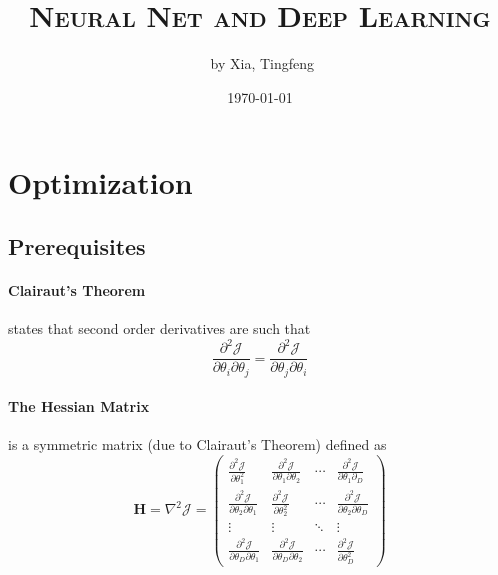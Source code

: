 \documentclass[11pt]{article}
\author{\ccLogo \,\,by Xia, Tingfeng}
\title{\textsc{Neural Net and Deep Learning}}
\date{\today}
\begin{document}
\maketitle
\doclicenseThis


\tableofcontents
\newpage


\section{Optimization}
\subsection{Prerequisites}

\paragraph{Clairaut's Theorem} states that second order derivatives are such that
\begin{equation}
    \frac{\partial^{2} \mathcal{J}}{\partial \theta_{i} \partial \theta_{j}}=\frac{\partial^{2} \mathcal{J}}{\partial \theta_{j} \partial \theta_{i}}
\end{equation}

\paragraph{The Hessian Matrix} is a symmetric matrix (due to Clairaut's Theorem) defined as
\begin{equation}
    \mathbf{H}=\nabla^{2} \mathcal{J}=\left(\begin{array}{cccc}
{\frac{\partial^{2} \mathcal{J}}{\partial \theta_{1}^{2}}} & {\frac{\partial^{2} \mathcal{J}}{\partial \theta_{1} \partial \theta_{2}}} & {\cdots} & {\frac{\partial^{2} \mathcal{J}}{\partial \theta_{1} \partial_{D}}} \\
{\frac{\partial^{2} \mathcal{J}}{\partial \theta_{2} \partial \theta_{1}}} & {\frac{\partial^{2} \mathcal{J}}{\partial \theta_{2}^{2}}} & {\cdots} & {\frac{\partial^{2} \mathcal{J}}{\partial \theta_{2} \partial \theta_{D}}} \\
{\vdots} & {\vdots} & {\ddots} & {\vdots} \\
{\frac{\partial^{2} \mathcal{J}}{\partial \theta_{D} \partial \theta_{1}}} & {\frac{\partial^{2} \mathcal{J}}{\partial \theta_{D} \partial \theta_{2}}} & {\cdots} & {\frac{\partial^{2} \mathcal{J}}{\partial \theta_{D}^{2}}}
\end{array}\right)
\end{equation}
\end{document}

